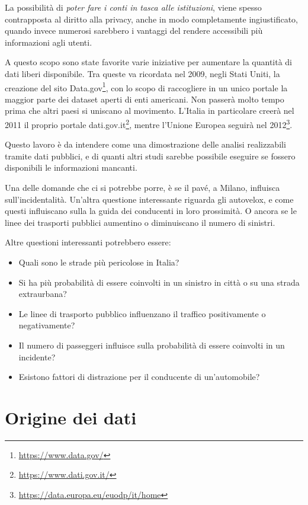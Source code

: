 \documentclass[a4paper,12pt]{report}
\newcommand{\quotestyle}[1]{\textit{#1}}
\newcommand{\skipline}{\vspace{0.2in}}
\begin{document}
La possibilità di \quotestyle{poter fare i conti in tasca alle istituzioni}, viene 
spesso contrapposta al diritto alla privacy, anche in 
modo completamente ingiustificato, quando invece numerosi sarebbero i vantaggi 
del rendere accessibili più informazioni agli utenti.

A questo scopo sono state favorite varie iniziative per aumentare la quantità di 
dati liberi disponibile. 
Tra queste va ricordata nel 2009, negli Stati Uniti, la creazione del sito 
Data.gov\footnote{\url{https://www.data.gov/}}, 
con lo scopo di raccogliere in un unico portale la maggior parte dei dataset 
aperti di enti americani. 
Non passerà molto tempo prima che altri paesi si uniscano al movimento. 
L'Italia in particolare creerà nel 2011 il proprio portale 
dati.gov.it\footnote{\url{https://www.dati.gov.it/}}, mentre l'Unione Europea seguirà 
nel 2012\footnote{\url{https://data.europa.eu/euodp/it/home}}. 

\skipline
Questo lavoro è da intendere come una dimostrazione delle analisi realizzabili 
tramite dati pubblici, e di quanti altri studi sarebbe possibile eseguire se fossero 
disponibili le informazioni mancanti. 

Una delle domande che ci si potrebbe porre, è se il pavé, a Milano, 
influisca sull'incidentalità. 
Un'altra questione interessante riguarda gli autovelox, e come questi influiscano sulla 
la guida dei conducenti in loro prossimità. 
O ancora se le linee dei trasporti pubblici aumentino o diminuiscano il numero di sinistri. 

Altre questioni interessanti potrebbero essere:
\begin{itemize}
    \item Quali sono le strade più pericolose in Italia?
    \item Si ha più probabilità di essere coinvolti in un sinistro in città o su una strada extraurbana? 
    \item Le linee di trasporto pubblico influenzano il traffico positivamente o negativamente?
    \item Il numero di passeggeri influisce sulla probabilità di essere coinvolti in un incidente? 
    \item Esistono fattori di distrazione per il conducente di un'automobile? 
\end{itemize}

\chapter{Origine dei dati}
\end{document}
